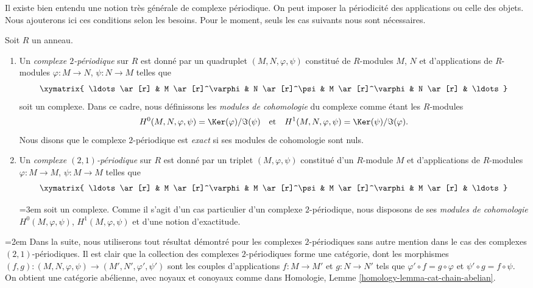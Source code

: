 \noindent
Il existe bien entendu une notion très générale de complexe périodique.
On peut imposer la périodicité des applications ou celle des objets.
Nous ajouterons ici ces conditions selon les besoins. Pour le moment, seuls les
cas suivants nous sont nécessaires.

\begin{definition}
\label{definition-periodic-complex}
Soit $R$ un anneau.
\begin{enumerate}
\item Un {\it complexe $2$-périodique} sur $R$ est donné
par un quadruplet $(M, N, \varphi, \psi)$ constitué de
$R$-modules $M$, $N$ et d'applications de $R$-modules $\varphi : M \to N$,
$\psi : N \to M$ telles que
$$
\xymatrix{
\ldots \ar[r] &
M \ar[r]^\varphi &
N \ar[r]^\psi &
M \ar[r]^\varphi &
N \ar[r] & \ldots
}
$$
soit un complexe. Dans ce cadre, nous définissons les {\it modules de cohomologie}
du complexe comme étant les $R$-modules
$$
H^0(M, N, \varphi, \psi) = \Ker(\varphi)/\Im(\psi)
\quad\text{et}\quad
H^1(M, N, \varphi, \psi) = \Ker(\psi)/\Im(\varphi).
$$
Nous disons que le complexe $2$-périodique est {\it exact} si ses modules de cohomologie
sont nuls.
\item Un {\it complexe $(2, 1)$-périodique} sur $R$ est donné
par un triplet $(M, \varphi, \psi)$ constitué d'un $R$-module $M$ et
d'applications de $R$-modules $\varphi : M \to M$, $\psi : M \to M$
telles que
$$
\xymatrix{
\ldots \ar[r] &
M \ar[r]^\varphi &
M \ar[r]^\psi &
M \ar[r]^\varphi &
M \ar[r] & \ldots
}
$$
{\emergencystretch=3em soit un complexe. Comme il s'agit d'un cas particulier d'un complexe $2$-périodique,
nous disposons de ses {\it modules de cohomologie} $H^0(M, \varphi, \psi)$,
$H^1(M, \varphi, \psi)$ et d'une notion d'exactitude.\par}
\end{enumerate}
\end{definition}

{\emergencystretch=2em\noindent
Dans la suite, nous utiliserons tout résultat démontré pour les complexes $2$-périodiques
sans autre mention dans le cas des complexes $(2, 1)$-périodiques.
Il est clair que la collection des complexes $2$-périodiques forme une
catégorie, dont les morphismes
$(f, g) : (M, N, \varphi, \psi) \to (M', N', \varphi', \psi')$
sont les couples d'applications $f : M \to M'$ et $g : N \to N'$ tels
que $\varphi' \circ f = g \circ \varphi$ et $\psi' \circ g = f \circ \psi$.
On obtient une catégorie abélienne, avec noyaux et conoyaux comme dans
Homologie, Lemme \ref{homology-lemma-cat-chain-abelian}.\par}


